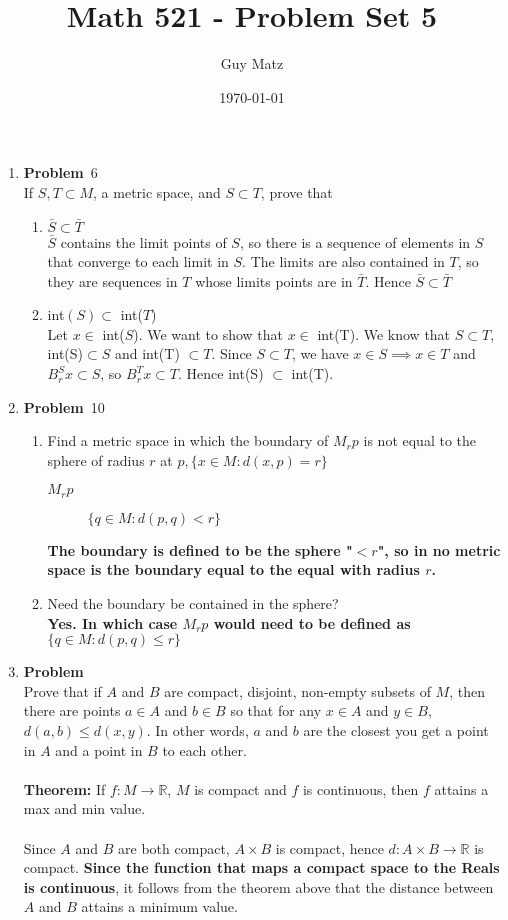 \documentclass[12pt]{amsart}
\title{\textbf{Math 521 - Problem Set 5}}
\author{Guy Matz}
\date{\today}
\newcommand{\benu}{\begin{enumerate}}
\newcommand{\eenu}{\end{enumerate}}
\theoremstyle{definition}
\newcommand{\mbR}{\mathbb{R}}
\newcommand{\itep}{\item {\bfseries Problem}\ }
\begin{document}
 


\begin{enumerate}[series=p]
\itep 6\\
If $S, T \subset M$, a metric space, and $S \subset T$, prove that
	\benu
	\item $\bar{S} \subset \bar{T}$\\
	$\bar{S}$ contains the limit points of $S$, so there is a sequence of elements in $S$ that converge to each limit in $S$.  The limits are also contained in $T$, so they are sequences in $T$ whose limits points are in $\bar{T}$.  Hence $\bar{S} \subset \bar{T}$
	\item int$(S) \subset$ int($T$) \\
	Let $x \in $ int($S$).  We want to show that $x \in $ int(T).  We know that $S \subset T$, int(S)$ \subset S$ and  int(T) $\subset T$.  Since $S \subset T$, we have $x \in S \implies x \in T$ and $B_r^Sx \subset S$, so $B_r^Tx \subset T$.  Hence int(S) $\subset$ int(T).
	\eenu
\newpage

\itep 10\\
\benu
	\item Find a metric space in which the boundary of $M_rp$ is not equal to the sphere of radius $r$ at $p, \{x \in M : d(x,p) = r\}$\\
	\begin{description}
		\item[$M_rp$] $\{q \in M: d(p,q) < r\}$
	\end{description}
	\textbf{The boundary is defined to be the sphere "$< r$", so in no metric space is the boundary equal to the equal with radius $r$.}
	\\
	\item Need the boundary be contained in the sphere?\\
	\textbf{Yes.  In which case $M_rp$ would need to be defined as $\{ q \in M: d(p,q) \leq r\}$}
	
\eenu

\newpage

\itep \\
Prove that if $A$ and $B$ are compact, disjoint, non-empty subsets of $M$, then there are points $a\in A$ and $b\in B$ so that for any $x\in A$ and $y\in B$, $d(a,b)\leq d(x,y)$. In other words, $a$ and $b$ are the closest you get a point in $A$ and a point in $B$ to each other.
\\
\\
\textbf{Theorem:}
If $f:M \to \mbR$, $M$ is compact and $f$ is continuous, then $f$ attains a max and min value.
\\\\
Since $A$ and $B$ are both compact, $A \times B$ is compact, hence $d: A \times B \to \mbR$ is compact.  \textbf{Since the function that maps a compact space to the Reals is continuous}, it follows from the theorem above that the distance between $A$ and $B$ attains a minimum value.


\end{enumerate}
\end{document}
